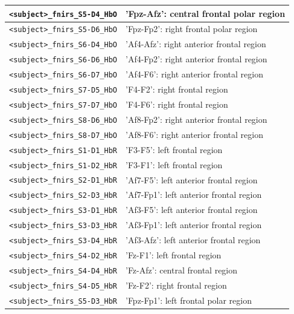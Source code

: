 \begin{table}
\begin{tabularx}{\textwidth}{|l|X|}
    \hline
    \texttt{<subject>\_fnirs\_S5-D4\_HbO} & 'Fpz-Afz': central frontal polar region  \\
    \hline
    \texttt{<subject>\_fnirs\_S5-D6\_HbO} & 'Fpz-Fp2': right frontal polar region  \\
    \hline
    \texttt{<subject>\_fnirs\_S6-D4\_HbO} & 'Af4-Afz': right anterior frontal region  \\
    \hline
    \texttt{<subject>\_fnirs\_S6-D6\_HbO} & 'Af4-Fp2': right anterior frontal region  \\
    \hline
    \texttt{<subject>\_fnirs\_S6-D7\_HbO} & 'Af4-F6': right anterior frontal region  \\
    \hline
    \texttt{<subject>\_fnirs\_S7-D5\_HbO} & 'F4-F2': right frontal region  \\
    \hline
    \texttt{<subject>\_fnirs\_S7-D7\_HbO} & 'F4-F6': right frontal region  \\
    \hline
    \texttt{<subject>\_fnirs\_S8-D6\_HbO} & 'Af8-Fp2': right anterior frontal region  \\
    \hline
    \texttt{<subject>\_fnirs\_S8-D7\_HbO} & 'Af8-F6': right anterior frontal region  \\
    \hline
    \texttt{<subject>\_fnirs\_S1-D1\_HbR} & 'F3-F5': left frontal region  \\
    \hline
    \texttt{<subject>\_fnirs\_S1-D2\_HbR} & 'F3-F1': left frontal region  \\
    \hline
    \texttt{<subject>\_fnirs\_S2-D1\_HbR} & 'Af7-F5': left anterior frontal region  \\
    \hline
    \texttt{<subject>\_fnirs\_S2-D3\_HbR} & 'Af7-Fp1': left anterior frontal region  \\
    \hline
    \texttt{<subject>\_fnirs\_S3-D1\_HbR} & 'Af3-F5': left anterior frontal region  \\
    \hline
    \texttt{<subject>\_fnirs\_S3-D3\_HbR} & 'Af3-Fp1': left anterior frontal region  \\
    \hline
    \texttt{<subject>\_fnirs\_S3-D4\_HbR} & 'Af3-Afz': left anterior frontal region  \\
    \hline
    \texttt{<subject>\_fnirs\_S4-D2\_HbR} & 'Fz-F1': left frontal region  \\
    \hline
    \texttt{<subject>\_fnirs\_S4-D4\_HbR} & 'Fz-Afz': central frontal region  \\
    \hline
    \texttt{<subject>\_fnirs\_S4-D5\_HbR} & 'Fz-F2': right frontal region  \\
    \hline
    \texttt{<subject>\_fnirs\_S5-D3\_HbR} & 'Fpz-Fp1': left frontal polar region  \\

\end{tabularx}
\end{table}
